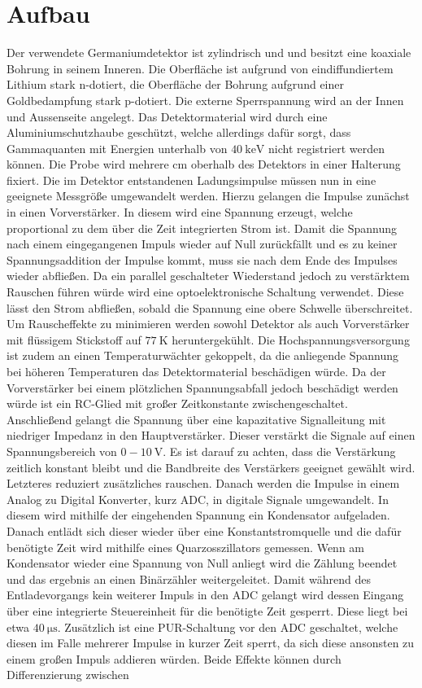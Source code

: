 \section{Aufbau}
\label{sec:Aufbau}

Der verwendete Germaniumdetektor ist zylindrisch und und besitzt eine koaxiale Bohrung in seinem Inneren. Die Oberfläche ist aufgrund von eindiffundiertem Lithium stark n-dotiert, die Oberfläche der Bohrung aufgrund einer Goldbedampfung stark p-dotiert. Die externe Sperrspannung wird an der Innen und Aussenseite angelegt. Das Detektormaterial wird durch eine Aluminiumschutzhaube geschützt, welche allerdings dafür sorgt, dass Gammaquanten mit Energien unterhalb von $\SI{40}{\kilo\electronvolt}$ nicht registriert werden können. Die Probe wird mehrere $\si{\centi\meter}$ oberhalb des Detektors in einer Halterung fixiert. Die im Detektor entstandenen Ladungsimpulse müssen nun in eine geeignete Messgröße umgewandelt werden. Hierzu gelangen die Impulse zunächst in einen Vorverstärker. In diesem wird eine Spannung erzeugt, welche proportional zu dem über die Zeit integrierten Strom ist. Damit die Spannung nach einem eingegangenen Impuls wieder auf Null zurückfällt und es zu keiner Spannungsaddition der Impulse kommt, muss sie nach dem Ende des Impulses wieder abfließen. Da ein parallel geschalteter Wiederstand jedoch zu verstärktem Rauschen führen würde wird eine optoelektronische Schaltung verwendet. Diese lässt den Strom abfließen, sobald die Spannung eine obere Schwelle überschreitet. Um Rauscheffekte zu minimieren werden sowohl Detektor als auch Vorverstärker mit flüssigem Stickstoff auf $\SI{77}{\kelvin}$ heruntergekühlt. Die Hochspannungsversorgung ist zudem an einen Temperaturwächter gekoppelt, da die anliegende Spannung bei höheren Temperaturen das Detektormaterial beschädigen würde. Da der Vorverstärker bei einem plötzlichen Spannungsabfall jedoch beschädigt werden würde ist ein RC-Glied mit großer Zeitkonstante zwischengeschaltet. Anschließend gelangt die Spannung über eine kapazitative Signalleitung mit niedriger Impedanz in den Hauptverstärker. Dieser verstärkt die Signale auf einen Spannungsbereich von $0 - \SI{10}{\volt}$. Es ist darauf zu achten, dass die Verstärkung zeitlich konstant bleibt und die Bandbreite des Verstärkers geeignet gewählt wird. Letzteres reduziert zusätzliches rauschen. Danach werden die Impulse in einem Analog zu Digital Konverter, kurz ADC, in digitale Signale umgewandelt. In diesem wird mithilfe der eingehenden Spannung ein Kondensator aufgeladen. Danach entlädt sich dieser wieder über eine Konstantstromquelle und die dafür benötigte Zeit wird mithilfe eines Quarzosszillators gemessen. Wenn am Kondensator wieder eine Spannung von Null anliegt wird die Zählung beendet und das ergebnis an einen Binärzähler weitergeleitet. Damit während des Entladevorgangs kein weiterer Impuls in den ADC gelangt wird dessen Eingang über eine integrierte Steuereinheit für die benötigte Zeit gesperrt. Diese liegt bei etwa $\SI{40}{\micro\second}$. Zusätzlich ist eine PUR-Schaltung vor den ADC geschaltet, welche diesen im Falle mehrerer Impulse in kurzer Zeit sperrt, da sich diese ansonsten zu einem großen Impuls addieren würden. Beide Effekte können durch Differenzierung zwischen 